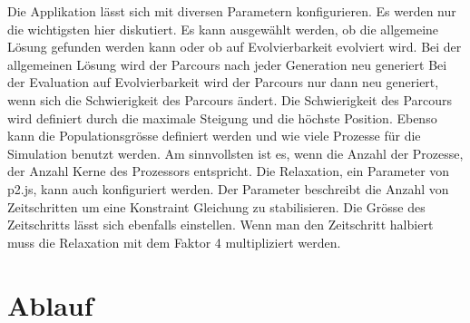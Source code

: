     Die Applikation lässt sich mit diversen Parametern konfigurieren.
    Es werden nur die wichtigsten hier diskutiert.
    Es kann ausgewählt werden, ob die allgemeine Lösung gefunden werden kann oder
    ob auf Evolvierbarkeit evolviert wird. Bei der allgemeinen Lösung wird der Parcours
    nach jeder Generation neu generiert Bei der Evaluation auf Evolvierbarkeit
    wird der Parcours nur dann neu generiert, wenn sich die Schwierigkeit des Parcours ändert.
    Die Schwierigkeit des Parcours wird definiert durch die maximale Steigung und die höchste Position.
    Ebenso kann die Populationsgrösse definiert werden und wie viele Prozesse für die Simulation benutzt werden.
    Am sinnvollsten ist es, wenn die Anzahl der Prozesse, der Anzahl Kerne des Prozessors entspricht.
    Die Relaxation, ein Parameter von p2.js, kann auch konfiguriert werden.
    Der Parameter beschreibt die Anzahl von Zeitschritten um eine Konstraint Gleichung zu stabilisieren.
    Die Grösse des Zeitschritts lässt sich ebenfalls einstellen.
    Wenn man den Zeitschritt halbiert muss die Relaxation mit dem
    Faktor 4 multipliziert werden.

  \section{Ablauf\label{sec:Ablauf}}

